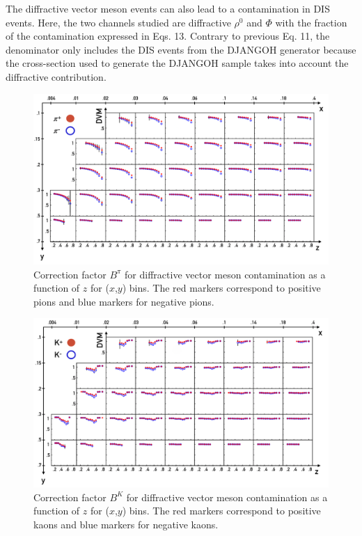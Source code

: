 \documentclass[letterpaper,12pt]{article}
\begin{document}
The diffractive vector meson events can also lead to a contamination in DIS events. Here, the two channels studied are diffractive $\rho^0$ and $\Phi$
with the fraction of the contamination expressed in Eqs. 13. Contrary to previous Eq. 11, the denominator only includes the DIS events from the
DJANGOH generator because the cross-section used to generate the DJANGOH sample takes into account the diffractive contribution.

\begin{figure}
	\includegraphics[scale=0.5]{./gfx/DVMpi.png}
	\caption{Correction factor $B^{\pi}$ for diffractive vector meson contamination as a function of $z$ for ($x$,$y$) bins. The red markers correspond to positive pions and blue markers for negative pions.}
	\label{DVMpi}
\end{figure}

\begin{figure}
	\includegraphics[scale=0.5]{./gfx/DVMK.png}
	\caption{Correction factor $B^{K}$ for diffractive vector meson contamination as a function of $z$ for ($x$,$y$) bins. The red markers correspond to positive kaons and blue markers for negative kaons.}
	\label{DVMK}
\end{figure}
\end{document}
